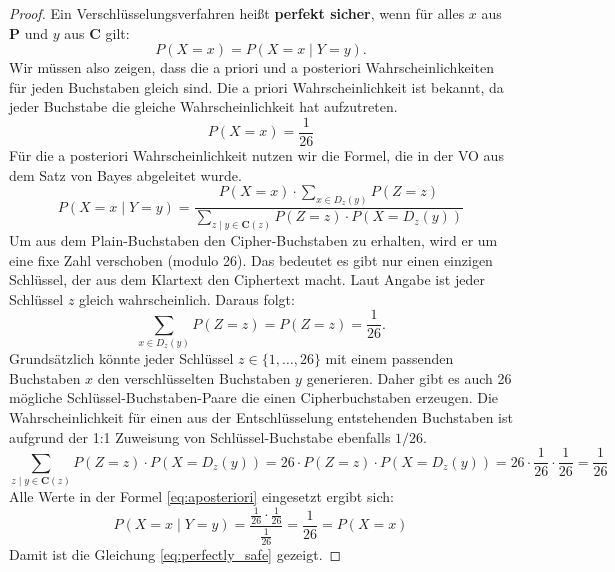 \documentclass{article}
\begin{document}
    \begin{proof}
        Ein Verschlüsselungsverfahren heißt \textbf{perfekt sicher}, wenn
        für alles $x$ aus $\mathbf{P}$ und $y$ aus $\mathbf{C}$ gilt:
        \begin{equation}\label{eq:perfectly_safe}
            P(X=x) = P(X=x\mid Y = y).
        \end{equation}
        Wir müssen also zeigen, dass die a priori und a posteriori Wahrscheinlichkeiten für jeden Buchstaben 
        gleich sind. Die a priori Wahrscheinlichkeit ist bekannt, da jeder Buchstabe die gleiche Wahrscheinlichkeit
        hat aufzutreten.
        \[
            P(X=x) = \frac{1}{26}
        \]
        Für die a posteriori Wahrscheinlichkeit nutzen wir die Formel, die in der VO aus dem Satz von Bayes abgeleitet wurde.
        \begin{equation}\label{eq:aposteriori}
            P(X=x\mid Y=y) = \frac{P(X=x)\cdot\sum_{x\in D_z(y)}P(Z=z)}{\sum_{z\mid y\in \mathbf{C}(z)} P(Z=z)\cdot P(X=D_z(y))}
        \end{equation}
        Um aus dem Plain-Buchstaben den Cipher-Buchstaben zu erhalten, wird er um eine fixe Zahl verschoben (modulo 26).
        Das bedeutet es gibt nur einen einzigen Schlüssel, der aus dem Klartext den Ciphertext macht. Laut Angabe ist jeder
        Schlüssel $z$ gleich wahrscheinlich. Daraus folgt:
        \[
            \sum_{x\in D_z(y)}P(Z=z) = P(Z=z) = \frac{1}{26}.
        \]
        Grundsätzlich könnte jeder Schlüssel $z\in \{1, \dots, 26\}$ mit einem passenden Buchstaben $x$ den verschlüsselten Buchstaben $y$ generieren.
        Daher gibt es auch 26 mögliche Schlüssel-Buchstaben-Paare die einen Cipherbuchstaben erzeugen. Die
        Wahrscheinlichkeit für einen aus der Entschlüsselung entstehenden Buchstaben ist aufgrund der 1:1 Zuweisung von Schlüssel-Buchstabe ebenfalls
        $1/26$.
        \[
            \sum_{z\mid y\in \mathbf{C}(z)} P(Z=z)\cdot P(X=D_z(y)) =26\cdot P(Z=z)\cdot P(X=D_z(y)) = 26\cdot \frac{1}{26} \cdot \frac{1}{26}=\frac{1}{26} 
        \]
        Alle Werte in der Formel \ref{eq:aposteriori} eingesetzt ergibt sich:
        \[
            P(X=x \mid Y = y) = \frac{\frac{1}{26} \cdot \frac{1}{26}}{\frac{1}{26}} = \frac{1}{26} = P(X=x)
        \]
        Damit ist die Gleichung \ref{eq:perfectly_safe} gezeigt.
    \end{proof}
\end{document}
